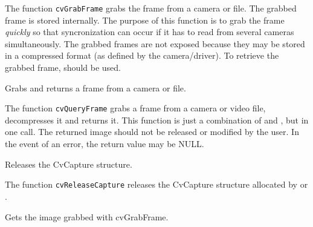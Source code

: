 
\begin{description}
\end{description}

The function \texttt{cvGrabFrame} grabs the frame from a camera or file. The grabbed frame is stored internally. The purpose of this function is to grab the frame \emph{quickly} so that syncronization can occur if it has to read from several cameras simultaneously. The grabbed frames are not exposed because they may be stored in a compressed format (as defined by the camera/driver). To retrieve the grabbed frame,  should be used.


Grabs and returns a frame from a camera or file.


\begin{description}
\end{description}

The function \texttt{cvQueryFrame} grabs a frame from a camera or video file, decompresses it and returns it. This function is just a combination of  and , but in one call. The returned image should not be released or modified by the user.  In the event of an error, the return value may be NULL.

\ifC
{} 
Releases the CvCapture structure.


\begin{description}
\end{description}

The function \texttt{cvReleaseCapture} releases the CvCapture structure allocated by  or .
\fi

Gets the image grabbed with cvGrabFrame.


\begin{description}
\end{description}

